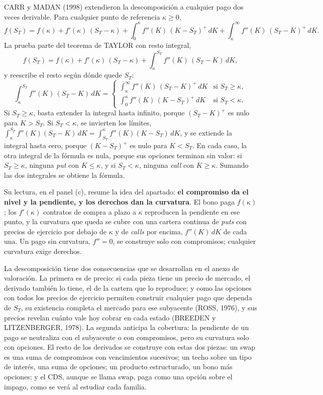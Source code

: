 \documentclass[10pt,a4paper]{article}
\newcounter{anexo}
\begin{document}
CARR y MADAN (1998) extendieron la descomposición a cualquier pago dos veces derivable. Para cualquier punto de referencia $\kappa\ge0$,
$$f(S_T)=f(\kappa)+f'(\kappa)\,(S_T-\kappa)+\int_0^{\kappa}f''(K)\,(K-S_T)^+\,dK+\int_{\kappa}^{\infty}f''(K)\,(S_T-K)^+\,dK.$$
La prueba parte del teorema de TAYLOR con resto integral,
$$f(S_T)=f(\kappa)+f'(\kappa)\,(S_T-\kappa)+\int_{\kappa}^{S_T}f''(K)\,(S_T-K)\,dK,$$
y reescribe el resto según dónde quede $S_T$:
$$\int_{\kappa}^{S_T}f''(K)\,(S_T-K)\,dK=\begin{cases}\displaystyle\int_{\kappa}^{\infty}f''(K)\,(S_T-K)^+\,dK & \text{si } S_T\ge\kappa,\\[1.2em] \displaystyle\int_{0}^{\kappa}f''(K)\,(K-S_T)^+\,dK & \text{si } S_T<\kappa.\end{cases}$$
Si $S_T\ge\kappa$, basta extender la integral hasta infinito, porque $(S_T-K)^+$ es nulo para $K>S_T$. Si $S_T<\kappa$, se invierten los límites, $\int_{\kappa}^{S_T}f''(K)(S_T-K)\,dK=\int_{S_T}^{\kappa}f''(K)(K-S_T)\,dK$, y se extiende la integral hasta cero, porque $(K-S_T)^+$ es nulo para $K<S_T$. En cada caso, la otra integral de la fórmula es nula, porque sus opciones terminan sin valor: si $S_T\ge\kappa$, ninguna \textit{put} con $K\le\kappa$, y si $S_T<\kappa$, ninguna \textit{call} con $K\ge\kappa$. Sumando las dos integrales se obtiene la fórmula.

Su lectura, en el panel (c), resume la idea del apartado: \textbf{el compromiso da el nivel y la pendiente, y los derechos dan la curvatura}. El bono paga $f(\kappa)$; los $f'(\kappa)$ contratos de compra a plazo a $\kappa$ reproducen la pendiente en ese punto, y la curvatura que queda se cubre con una cartera continua de \textit{puts} con precios de ejercicio por debajo de $\kappa$ y de \textit{calls} por encima, $f''(K)\,dK$ de cada una. Un pago sin curvatura, $f''=0$, se construye solo con compromisos; cualquier curvatura exige derechos.

La descomposición tiene dos consecuencias que se desarrollan en el anexo de valoración. La primera es de precio: si cada pieza tiene un precio de mercado, el derivado también lo tiene, el de la cartera que lo reproduce; y como las opciones con todos los precios de ejercicio permiten construir cualquier pago que dependa de $S_T$, su existencia completa el mercado para ese subyacente (ROSS, 1976), y sus precios revelan cuánto vale hoy cobrar en cada estado (BREEDEN y LITZENBERGER, 1978). La segunda anticipa la cobertura: la pendiente de un pago se neutraliza con el subyacente o con compromisos, pero su curvatura solo con opciones. El resto de los derivados se construye con estas dos piezas: un swap es una suma de compromisos con vencimientos sucesivos; un techo sobre un tipo de interés, una suma de opciones; un producto estructurado, un bono más opciones; y el CDS, aunque se llama swap, paga como una opción sobre el impago, como se verá al estudiar cada familia.
\end{document}
